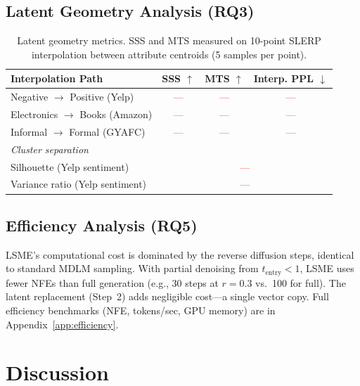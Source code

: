 \documentclass{article}
\newcommand{\tbd}[1]{\textcolor{red}{#1}}  %
\begin{document}
\subsection{Latent Geometry Analysis (RQ3)}
\label{sec:geometry_results}


\begin{table}[t]
\centering
\caption{Latent geometry metrics. SSS and MTS measured on 10-point SLERP interpolation between attribute centroids (5 samples per point).}
\label{tab:geometry}
\small
\begin{tabular}{lccc}
\toprule
\textbf{Interpolation Path} & \textbf{SSS} $\uparrow$ & \textbf{MTS} $\uparrow$ & \textbf{Interp. PPL} $\downarrow$ \\
\midrule
Negative $\to$ Positive (Yelp) & \tbd{---} & \tbd{---} & \tbd{---} \\
Electronics $\to$ Books (Amazon) & \tbd{---} & \tbd{---} & \tbd{---} \\
Informal $\to$ Formal (GYAFC) & \tbd{---} & \tbd{---} & \tbd{---} \\
\midrule
\multicolumn{4}{l}{\textit{Cluster separation}} \\
Silhouette (Yelp sentiment) & \multicolumn{3}{c}{\tbd{---}} \\
Variance ratio (Yelp sentiment) & \multicolumn{3}{c}{\tbd{---}} \\
\bottomrule
\end{tabular}
\end{table}

\subsection{Efficiency Analysis (RQ5)}
\label{sec:efficiency}

LSME's computational cost is dominated by the reverse diffusion steps, identical to standard MDLM sampling.
With partial denoising from $t_\text{entry} < 1$, LSME uses fewer NFEs than full generation (e.g., 30 steps at $r = 0.3$ vs.\ 100 for full).
The latent replacement (Step~2) adds negligible cost---a single vector copy.
Full efficiency benchmarks (NFE, tokens/sec, GPU memory) are in Appendix~\ref{app:efficiency}.

\section{Discussion}
\label{sec:discussion}
\end{document}

